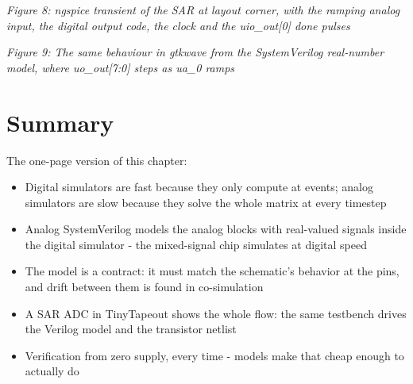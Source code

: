 \begin{Shaded}
\begin{Highlighting}[]
    \OperatorTok{)} 
\OperatorTok{=}\OperatorTok{;}
\OperatorTok{=}\OperatorTok{;}

    \OperatorTok{)} 
      \OperatorTok{(}\OperatorTok{==}\OperatorTok{)}
        \OperatorTok{=} \OperatorTok{;}
       \OperatorTok{(}\OperatorTok{==}\OperatorTok{)}
        \OperatorTok{=} \OperatorTok{;}
       \OperatorTok{(}\OperatorTok{==}\OperatorTok{)}
        \OperatorTok{=} \OperatorTok{;}
\end{Highlighting}
\end{Shaded}


{
\centering
{}
}

\emph{Figure 8: ngspice transient of the SAR at layout corner, with the
ramping analog input, the digital output code, the clock and the
uio\_out{[}0{]} done pulses}


{
\centering
{}
}

\emph{Figure 9: The same behaviour in gtkwave from the SystemVerilog
real-number model, where uo\_out{[}7:0{]} steps as ua\_0 ramps}

\section{Summary}\label{summary}

The one-page version of this chapter:

\begin{itemize}
\tightlist
\item
  Digital simulators are fast because they only compute at events;
  analog simulators are slow because they solve the whole matrix at
  every timestep
\item
  Analog SystemVerilog models the analog blocks with real-valued signals
  inside the digital simulator - the mixed-signal chip simulates at
  digital speed
\item
  The model is a contract: it must match the schematic's behavior at the
  pins, and drift between them is found in co-simulation
\item
  A SAR ADC in TinyTapeout shows the whole flow: the same testbench
  drives the Verilog model and the transistor netlist
\item
  Verification from zero supply, every time - models make that cheap
  enough to actually do
\end{itemize}

